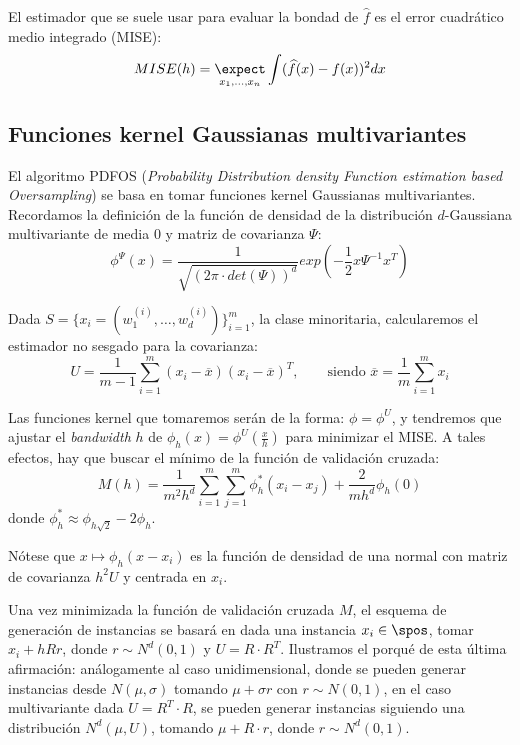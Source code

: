 El estimador que se suele usar para evaluar la bondad de $\widehat{f}$ es el error cuadrático medio integrado (MISE):
\[
  MISE(h) = \underset{x_1, \ldots, x_n}{\expect} \int (\widehat{f}(x) - f(x))^2 dx
\]



\subsection{Funciones kernel Gaussianas multivariantes}
El algoritmo PDFOS (\textit{Probability Distribution density Function estimation based Oversampling}) se basa en tomar
funciones kernel Gaussianas multivariantes. Recordamos la definición de la función de densidad de la distribución $d$-Gaussiana 
multivariante de media $0$ y matriz de covarianza $\Psi$:
\[
  \phi^{\Psi}(x) = \frac{1}{\sqrt{(2\pi \cdot det(\Psi))^d}} exp\left(-\frac{1}{2} x \Psi^{-1} x^T \right)
\]

Dada $S = \{x_i = (w_1^{(i)}, \ldots, w_d^{(i)})\}_{i=1}^m$, la clase minoritaria, calcularemos el estimador no sesgado 
para la covarianza:
\[
  U = \frac{1}{m-1} \sum_{i=1}^m (x_i - \overline{x})(x_i - \overline{x})^T, 
  \qquad \textrm{siendo } \overline{x} = \frac{1}{m}\sum_{i=1}^m x_i
\]
  
Las funciones kernel que tomaremos serán de la forma: $\phi = \phi^{U}$, y tendremos que ajustar el \textit{bandwidth} $h$ de
$\phi_h(x) = \phi^U\left(\frac{x}{h}\right)$ para minimizar el MISE. A tales efectos, hay que buscar el mínimo de
la función de validación cruzada:
\begin{equation}
 M(h) = \frac{1}{m^2 h^d} \sum_{i=1}^m \sum_{j=1}^m \phi_h^{\ast} (x_i - x_j) + \frac{2}{m h^d} \phi_h(0)
 \label{eq:cross-val}
\end{equation}
donde $\phi_h^{\ast} \approx \phi_{h\sqrt{2}} - 2\phi_h$.

Nótese que $x\mapsto \phi_h(x-x_i)$ es la función de densidad de una normal con matriz de covarianza $h^2 U$ y centrada en $x_i$.

Una vez minimizada la función de validación cruzada $M$, el esquema de generación de instancias se basará en dada una instancia
$x_i \in \spos$, tomar $x_i + h R r$, donde $r\sim N^d(0,1)$ y $U = R\cdot R^T$. Ilustramos el porqué de esta última afirmación:
análogamente al caso unidimensional, donde se pueden generar instancias desde $N(\mu, \sigma)$ tomando $\mu + \sigma r$
con $r\sim N(0,1)$, en el caso multivariante dada $U =  R^T \cdot R$, se pueden generar instancias siguiendo una distribución $N^d(\mu, U)$,
tomando $\mu + R \cdot r$, donde $r\sim N^d(0,1)$.

